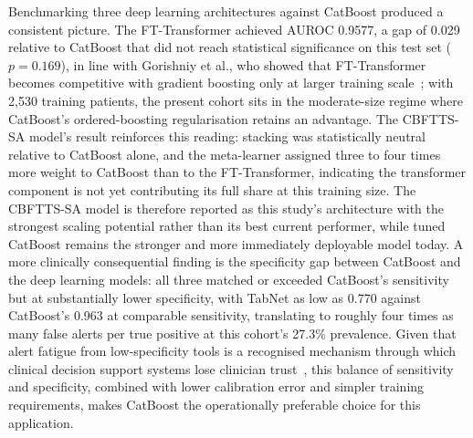 \documentclass[final,3p,times]{elsarticle}
\begin{document}
Benchmarking three deep learning architectures against CatBoost produced a
consistent picture. The FT-Transformer achieved AUROC 0.9577, a gap of 0.029
relative to CatBoost that did not reach statistical significance on this
test set ($p = 0.169$), in line with Gorishniy et al., who showed that
FT-Transformer becomes competitive with gradient boosting only at larger
training scale~\cite{gorishniy2021}; with 2,530 training patients, the
present cohort sits in the moderate-size regime where CatBoost's
ordered-boosting regularisation retains an advantage. The CBFTTS-SA model's result
reinforces this reading: stacking was statistically neutral relative to
CatBoost alone, and the meta-learner assigned three to four times more
weight to CatBoost than to the FT-Transformer, indicating the transformer
component is not yet contributing its full share at this training size.
The CBFTTS-SA model is therefore reported as this study's architecture with the
strongest scaling potential rather than its best current performer, while
tuned CatBoost remains the stronger and more immediately deployable model
today. A more clinically consequential finding is the specificity gap
between CatBoost and the deep learning models: all three matched or
exceeded CatBoost's sensitivity but at substantially lower specificity,
with TabNet as low as 0.770 against CatBoost's 0.963 at comparable
sensitivity, translating to roughly four times as many false alerts per
true positive at this cohort's 27.3\% prevalence. Given that alert fatigue
from low-specificity tools is a recognised mechanism through which clinical
decision support systems lose clinician trust~\cite{athukorala2026}, this
balance of sensitivity and specificity, combined with lower calibration
error and simpler training requirements, makes CatBoost the operationally
preferable choice for this application.
\end{document}
